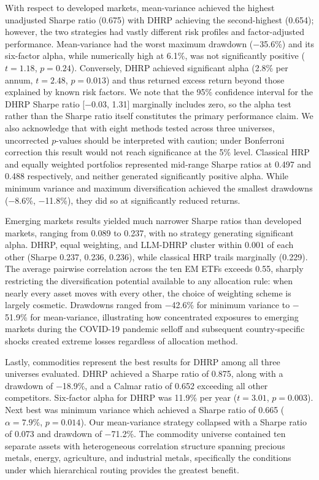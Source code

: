 With respect to developed markets, mean-variance achieved the highest unadjusted Sharpe ratio (0.675) with DHRP achieving the second-highest (0.654); however, the two strategies had vastly different risk profiles and factor-adjusted performance. Mean-variance had the worst maximum drawdown ($-$35.6\%) and its six-factor alpha, while numerically high at 6.1\%, was not significantly positive ($t=1.18$, $p=0.24$). Conversely, DHRP achieved significant alpha (2.8\% per annum, $t = 2.48$, $p = 0.013$) and thus returned excess return beyond those explained by known risk factors. We note that the 95\% confidence interval for the DHRP Sharpe ratio [$-$0.03, 1.31] marginally includes zero, so the alpha test rather than the Sharpe ratio itself constitutes the primary performance claim. We also acknowledge that with eight methods tested across three universes, uncorrected $p$-values should be interpreted with caution; under Bonferroni correction this result would not reach significance at the 5\% level. Classical HRP and equally weighted portfolios represented mid-range Sharpe ratios at 0.497 and 0.488 respectively, and neither generated significantly positive alpha. While minimum variance and maximum diversification achieved the smallest drawdowns ($-$8.6\%, $-$11.8\%), they did so at significantly reduced returns.

Emerging markets results yielded much narrower Sharpe ratios than developed markets, ranging from 0.089 to 0.237, with no strategy generating significant alpha. DHRP, equal weighting, and LLM-DHRP cluster within $0.001$ of each other (Sharpe 0.237, 0.236, 0.236), while classical HRP trails marginally (0.229). The average pairwise correlation across the ten EM ETFs exceeds 0.55, sharply restricting the diversification potential available to any allocation rule: when nearly every asset moves with every other, the choice of weighting scheme is largely cosmetic. Drawdowns ranged from $-$42.6\% for minimum variance to $-$51.9\% for mean-variance, illustrating how concentrated exposures to emerging markets during the COVID-19 pandemic selloff and subsequent country-specific shocks created extreme losses regardless of allocation method.

Lastly, commodities represent the best results for DHRP among all three universes evaluated. DHRP achieved a Sharpe ratio of 0.875, along with a drawdown of $-$18.9\%, and a Calmar ratio of 0.652 exceeding all other competitors. Six-factor alpha for DHRP was 11.9\% per year ($t=3.01$, $p=0.003$). Next best was minimum variance which achieved a Sharpe ratio of 0.665 ($\alpha = 7.9\%$, $p = 0.014$). Our mean-variance strategy collapsed with a Sharpe ratio of 0.073 and drawdown of $-$71.2\%. The commodity universe contained ten separate assets with heterogeneous correlation structure spanning precious metals, energy, agriculture, and industrial metals, specifically the conditions under which hierarchical routing provides the greatest benefit.

